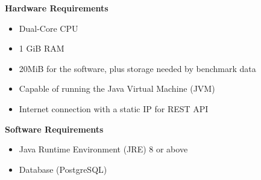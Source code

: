 \textbf{Hardware Requirements}
\begin{itemize}
    \item Dual-Core CPU
    \item 1 GiB RAM
    \item 20MiB for the software, plus storage needed by benchmark data
    \item Capable of running the Java Virtual Machine (JVM)
    \item Internet connection with a static IP for REST API
\end{itemize}

\textbf{Software Requirements}
\begin{itemize}
    \item Java Runtime Environment (JRE) 8 or above
    \item Database (PostgreSQL)
\end{itemize}
